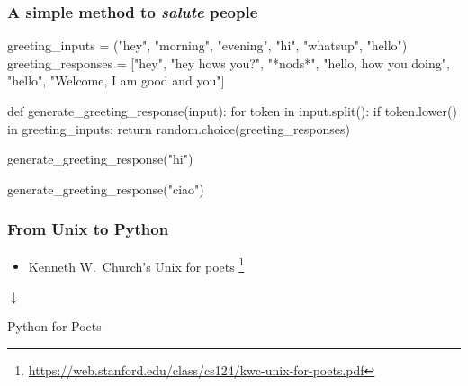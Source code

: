 \documentclass{beamer}
\begin{document}
\begin{frame}[fragile]
\frametitle{A simple method to \textit{salute} people}
\vspace{5mm}

\begin{python}
greeting_inputs = ("hey", "morning", "evening", "hi",
                "whatsup", "hello")
greeting_responses = ["hey", "hey hows you?", "*nods*",
                "hello, how you doing", "hello",
                "Welcome, I am good and you"]

def generate_greeting_response(input):
    for token in input.split():
        if token.lower() in greeting_inputs:
            return random.choice(greeting_responses)
\end{python}
\pause

\begin{python}
generate_greeting_response("hi")
\end{python}
\pause

\begin{python}
generate_greeting_response("ciao")
\end{python}

\end{frame}

\begin{frame}
\frametitle{From Unix to Python}

\begin{itemize}
  \item Kenneth W.\ Church's \alert{Unix for poets}%
\footnote{\url{https://web.stanford.edu/class/cs124/kwc-unix-for-poets.pdf}}
\end{itemize}
\medskip
\pause

\centering

$\downarrow$
\medskip

\alert{Python for Poets}


\end{frame}
\end{document}
